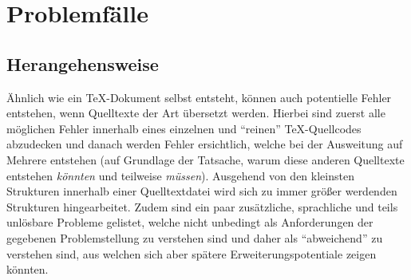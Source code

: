 \section{Problemfälle}
\subsection{Herangehensweise}
Ähnlich wie ein \TeX{}-Dokument selbst entsteht, können auch potentielle Fehler entstehen, wenn Quelltexte der Art übersetzt werden. Hierbei sind zuerst alle möglichen Fehler innerhalb eines einzelnen und \enquote{reinen} \TeX{}-Quellcodes abzudecken und danach werden Fehler ersichtlich, welche bei der Ausweitung auf Mehrere entstehen (auf Grundlage der Tatsache, warum diese anderen Quelltexte entstehen \textit{könnten} und teilweise \textit{müssen}). Ausgehend von den kleinsten Strukturen innerhalb einer Quelltextdatei wird sich zu immer größer werdenden Strukturen hingearbeitet.
Zudem sind ein paar zusätzliche, sprachliche und teils unlösbare Probleme gelistet, welche nicht unbedingt als Anforderungen der gegebenen Problemstellung zu verstehen sind und daher als \enquote{abweichend} zu verstehen sind, aus welchen sich aber spätere Erweiterungspotentiale zeigen könnten.
%
